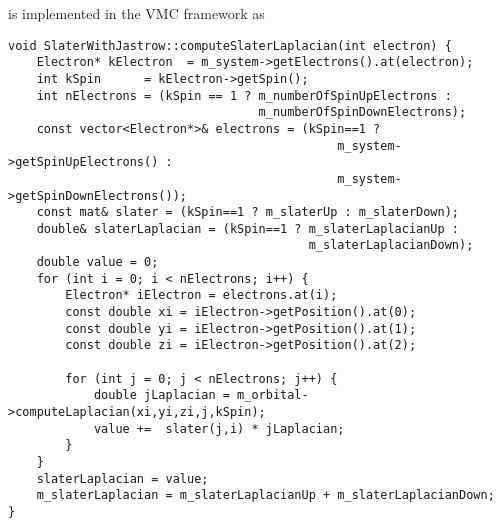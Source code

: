 \documentclass[../../master.tex]{subfiles}
\begin{document}
 is implemented in the VMC framework as
\begin{lstlisting}[language={[std]c++}]
void SlaterWithJastrow::computeSlaterLaplacian(int electron) {
    Electron* kElectron  = m_system->getElectrons().at(electron);
    int kSpin      = kElectron->getSpin();
    int nElectrons = (kSpin == 1 ? m_numberOfSpinUpElectrons :
                                   m_numberOfSpinDownElectrons);
    const vector<Electron*>& electrons = (kSpin==1 ?
                                              m_system->getSpinUpElectrons() :
                                              m_system->getSpinDownElectrons());
    const mat& slater = (kSpin==1 ? m_slaterUp : m_slaterDown);
    double& slaterLaplacian = (kSpin==1 ? m_slaterLaplacianUp :
                                          m_slaterLaplacianDown);
    double value = 0;
    for (int i = 0; i < nElectrons; i++) {
        Electron* iElectron = electrons.at(i);
        const double xi = iElectron->getPosition().at(0);
        const double yi = iElectron->getPosition().at(1);
        const double zi = iElectron->getPosition().at(2);

        for (int j = 0; j < nElectrons; j++) {
            double jLaplacian = m_orbital->computeLaplacian(xi,yi,zi,j,kSpin);
            value +=  slater(j,i) * jLaplacian;
        }
    }
    slaterLaplacian = value;
    m_slaterLaplacian = m_slaterLaplacianUp + m_slaterLaplacianDown;
}
\end{lstlisting}
\end{document}
